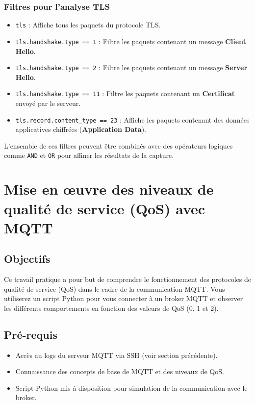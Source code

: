 \documentclass{article}
\begin{document}
\subsubsection{Filtres pour l'analyse TLS}
\begin{itemize}
    \item \texttt{tls} : Affiche tous les paquets du protocole TLS.
    \item \texttt{tls.handshake.type == 1} : Filtre les paquets contenant un message \textbf{Client Hello}.
    \item \texttt{tls.handshake.type == 2} : Filtre les paquets contenant un message \textbf{Server Hello}.
    \item \texttt{tls.handshake.type == 11} : Filtre les paquets contenant un \textbf{Certificat} envoyé par le serveur.
    \item \texttt{tls.record.content\_type == 23} : Affiche les paquets contenant des données applicatives chiffrées (\textbf{Application Data}).
\end{itemize}


L'ensemble de ces filtres peuvent être combinés avec des opérateurs logiques comme \texttt{AND} et \texttt{OR} pour affiner les résultats de la capture.



\section{Mise en œuvre des niveaux de qualité de service (QoS) avec MQTT}

\subsection{Objectifs}

Ce travail pratique a pour but de comprendre le fonctionnement des protocoles de qualité de service (QoS) dans le cadre de la communication MQTT. Vous utiliserez un script Python pour vous connecter à un broker MQTT et observer les différents comportements en fonction des valeurs de QoS (0, 1 et 2). 

\subsection{Pré-requis}

\begin{itemize}
    \item Accès au logs du serveur MQTT via SSH (voir section précédente).
    \item Connaissance des concepts de base de MQTT et des niveaux de QoS.
    \item Script Python mis à disposition pour simulation de la communication avec le broker.
\end{itemize}
\end{document}
